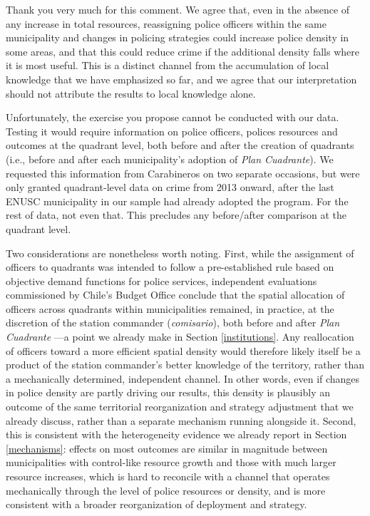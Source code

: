

Thank you very much for this comment. We agree that, even in the absence of any increase in total resources, reassigning police officers within the same municipality and changes in policing strategies could increase police density in some areas, and that this could reduce crime if the additional density falls where it is most useful. This is a distinct channel from the accumulation of local knowledge that we have emphasized so far, and we agree that our interpretation should not attribute the results to local knowledge alone.

Unfortunately, the exercise you propose cannot be conducted with our data. Testing it would require information on police officers, polices resources and outcomes at the quadrant level, both before and after the creation of quadrants (i.e., before and after each municipality's adoption of \emph{Plan Cuadrante}). We requested this information from Carabineros on two separate occasions, but were only granted quadrant-level data on crime from 2013 onward, after the last ENUSC municipality in our sample had already adopted the program. For the rest of data, not even that. This precludes any before/after comparison at the quadrant level.

Two considerations are nonetheless worth noting. First, while the assignment of officers to quadrants was intended to follow a pre-established rule based on objective demand functions for police services, independent evaluations commissioned by Chile's Budget Office conclude that the spatial allocation of officers across quadrants within municipalities remained, in practice, at the discretion of the station commander (\emph{comisario}), both before and after \emph{Plan Cuadrante} \citep{DIPRES2014}---a point we already make in Section \ref{institutions}. Any reallocation of officers toward a more efficient spatial density would therefore likely itself be a product of the station commander's better knowledge of the territory, rather than a mechanically determined, independent channel. In other words, even if changes in police density are partly driving our results, this density is plausibly an outcome of the same territorial reorganization and strategy adjustment that we already discuss, rather than a separate mechanism running alongside it. Second, this is consistent with the heterogeneity evidence we already report in Section \ref{mechanisms}: effects on most outcomes are similar in magnitude between municipalities with control-like resource growth and those with much larger resource increases, which is hard to reconcile with a channel that operates mechanically through the level of police resources or density, and is more consistent with a broader reorganization of deployment and strategy.

